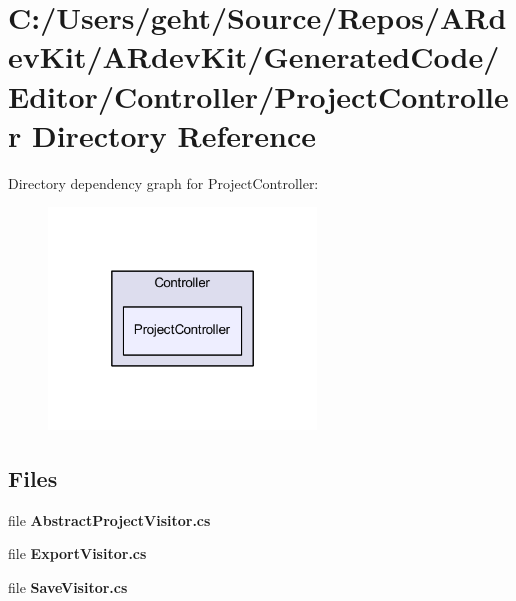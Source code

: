\section{C\-:/\-Users/geht/\-Source/\-Repos/\-A\-Rdev\-Kit/\-A\-Rdev\-Kit/\-Generated\-Code/\-Editor/\-Controller/\-Project\-Controller Directory Reference}
\label{dir_d02e1807fadc14e15b0f7e82321ecaca}
Directory dependency graph for Project\-Controller\-:
\nopagebreak
\begin{figure}[H]
\begin{center}
\leavevmode
\includegraphics[width=202pt]{dir_d02e1807fadc14e15b0f7e82321ecaca_dep}
\end{center}
\end{figure}
\subsection*{Files}
\begin{DoxyCompactItemize}
\item 
file {\bfseries Abstract\-Project\-Visitor.\-cs}
\item 
file {\bfseries Export\-Visitor.\-cs}
\item 
file {\bfseries Save\-Visitor.\-cs}
\end{DoxyCompactItemize}
